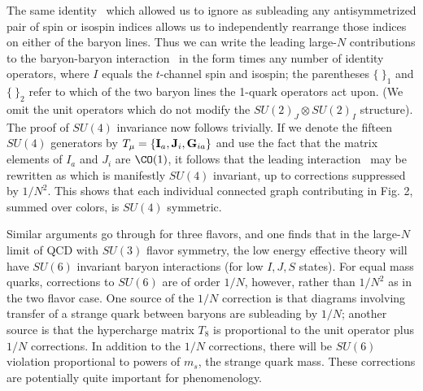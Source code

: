 The same identity \fierzii\ which allowed us to ignore as subleading any
antisymmetrized pair of spin or isospin indices allows us to independently
rearrange those indices on either of the baryon lines.  Thus we can write the
leading large-$N$  contributions to the baryon-baryon
interaction \interax\ in the form
\eqn{}
times any number of identity operators, where $I$ equals the $t$-channel spin
and isospin;   the parentheses $\{\ \}_1$ and $\{\ \}_2$ refer to which of the
two baryon lines the 1-quark operators act upon.   (We omit the unit operators
which do not
modify the $SU(2)_J\otimes SU(2)_I$ structure).
The proof of $SU(4)$ invariance now follows trivially.  If we denote the
fifteen $SU(4)$ generators by $T_\mu = \{{\bf I}_a, {\bf J}_i,{\bf G}_{ia}\}$
and use the fact
that the matrix elements of $I_a$ and $J_i$ are $\CO(1)$, it follows that the
leading interaction \xform\ may be rewritten as
\eqn{}
which is manifestly $SU(4)$ invariant, up to corrections suppressed by $1/N^2$.
 This
shows that each individual connected graph contributing in Fig. 2,  summed over
colors,  is $SU(4)$ symmetric.


Similar arguments go through for three flavors, and one finds that in the
large-$N$ limit of QCD with $SU(3)$ flavor symmetry,  the low energy effective
theory will have $SU(6)$ invariant baryon interactions (for low $I,J,S$
states).   For equal mass quarks, corrections to $SU(6)$ are of order $1/N$,
however, rather than $1/N^2$ as in the two flavor case.  One source  of the
$1/N$ correction is that diagrams involving transfer of a strange quark between
baryons are subleading by $1/N$; another source is that the hypercharge matrix
$T_8$ is proportional to the unit operator plus $1/N$ corrections.  In addition
to the $1/N$ corrections, there will be $SU(6)$ violation proportional to
powers of $m_s$, the strange quark mass.  These corrections are potentially
quite important for phenomenology.

